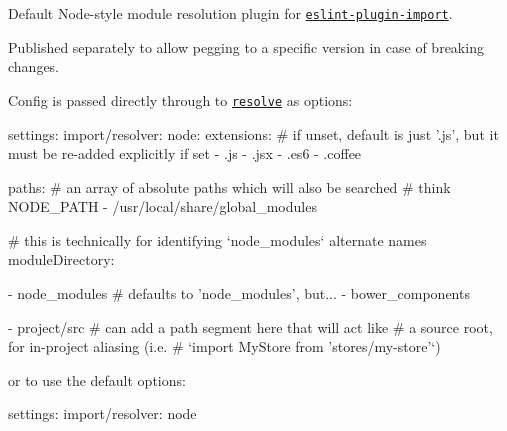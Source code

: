 \href{https://www.npmjs.com/package/eslint-import-resolver-node}{\tt }

Default Node-\/style module resolution plugin for \href{https://www.npmjs.com/package/eslint-plugin-import}{\tt {\ttfamily eslint-\/plugin-\/import}}.

Published separately to allow pegging to a specific version in case of breaking changes.

Config is passed directly through to \href{https://www.npmjs.com/package/resolve#resolve-sync-id-opts}{\tt {\ttfamily resolve}} as options\+:


\begin{DoxyCode}
settings:
  import/resolver:
    node:
      extensions:
        # if unset, default is just '.js', but it must be re-added explicitly if set
        - .js
        - .jsx
        - .es6
        - .coffee

      paths:
        # an array of absolute paths which will also be searched
        # think NODE\_PATH
        - /usr/local/share/global\_modules

      # this is technically for identifying `node\_modules` alternate names
      moduleDirectory:

        - node\_modules # defaults to 'node\_modules', but...
        - bower\_components

        - project/src  # can add a path segment here that will act like
                       # a source root, for in-project aliasing (i.e.
                       # `import MyStore from 'stores/my-store'`)
\end{DoxyCode}


or to use the default options\+:


\begin{DoxyCode}
settings:
  import/resolver: node
\end{DoxyCode}
 